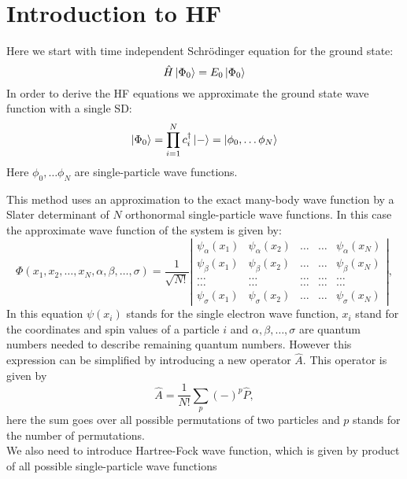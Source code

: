 \documentclass[twoside,english]{uiofysmaster}
\theoremstyle{definition}
\begin{document}
\section{Introduction to HF}
Here we start with time independent Schr\"{o}dinger equation for the ground state:
\begin{equation}
\hat{H}\ket{\Phi_0}=E_0\ket{\Phi_0}
\end{equation}
In order to derive the HF equations we approximate the ground state wave function with a single SD:
\begin{equation}
\ket{\Phi_0}=\prod_{i=1}^{N}c_i^\dagger\ket{-}=\ket{\phi_0, \dots \phi_N}
\end{equation}
Here $\phi_0, \dots \phi_N$ are single-particle wave functions.

This method uses an approximation to the exact many-body wave function by a Slater determinant of $N$ orthonormal single-particle wave functions. In this case the approximate wave function of the system is given by:
\begin{equation}
\Phi(x_1, x_2,\dots ,x_N,\alpha,\beta,\dots, \sigma)=\frac{1}{\sqrt{N!}}
\left| \begin{array}{ccccc} \psi_{\alpha}(x_1)& \psi_{\alpha}(x_2)& \dots & \dots & \psi_{\alpha}(x_N)\\
\psi_{\beta}(x_1)&\psi_{\beta}(x_2)& \dots & \dots & \psi_{\beta}(x_N)\\  
\dots & \dots & \dots & \dots & \dots \\
\dots & \dots & \dots & \dots & \dots \\
\psi_{\sigma}(x_1)&\psi_{\sigma}(x_2)& \dots & \dots & \psi_{\sigma}(x_N)\end{array} \right|, \label{eq:HartreeFockDet}
\end{equation}
In this equation $\psi(x_i)$ stands for the single electron wave function, $x_i$ stand for the coordinates and spin values of a particle $i$ and $\alpha, \beta,…,\sigma$ are quantum numbers needed to describe remaining quantum numbers.
However this expression can be simplified by introducing a new operator $\hat{A}$. This operator is given by 
\begin{equation}
\hat{A} = \frac{1}{N!}\sum_{p} (-)^p\hat{P},
\label{antiSymmetryOperator}
\end{equation}
here the sum goes over all possible permutations of two particles and $p$  stands for the number of permutations.\\
We also need to introduce Hartree-Fock wave function, which is given by product of all possible single-particle wave functions
\end{document}
